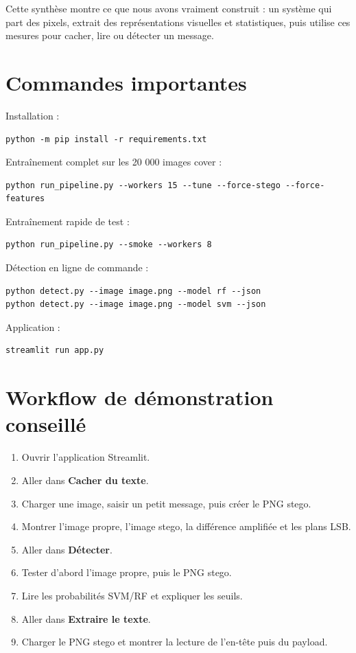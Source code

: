 \documentclass[11pt,a4paper]{article}
\begin{document}
Cette synthèse montre ce que nous avons vraiment construit : un système qui part des pixels, extrait des représentations visuelles et statistiques, puis utilise ces mesures pour cacher, lire ou détecter un message.

\section{Commandes importantes}
Installation :
\begin{lstlisting}
python -m pip install -r requirements.txt
\end{lstlisting}

Entraînement complet sur les 20 000 images cover :
\begin{lstlisting}
python run_pipeline.py --workers 15 --tune --force-stego --force-features
\end{lstlisting}

Entraînement rapide de test :
\begin{lstlisting}
python run_pipeline.py --smoke --workers 8
\end{lstlisting}

Détection en ligne de commande :
\begin{lstlisting}
python detect.py --image image.png --model rf --json
python detect.py --image image.png --model svm --json
\end{lstlisting}

Application :
\begin{lstlisting}
streamlit run app.py
\end{lstlisting}

\section{Workflow de démonstration conseillé}
\begin{enumerate}
  \item Ouvrir l'application Streamlit.
  \item Aller dans \textbf{Cacher du texte}.
  \item Charger une image, saisir un petit message, puis créer le PNG stego.
  \item Montrer l'image propre, l'image stego, la différence amplifiée et les plans LSB.
  \item Aller dans \textbf{Détecter}.
  \item Tester d'abord l'image propre, puis le PNG stego.
  \item Lire les probabilités SVM/RF et expliquer les seuils.
  \item Aller dans \textbf{Extraire le texte}.
  \item Charger le PNG stego et montrer la lecture de l'en-tête puis du payload.
\end{enumerate}
\end{document}
